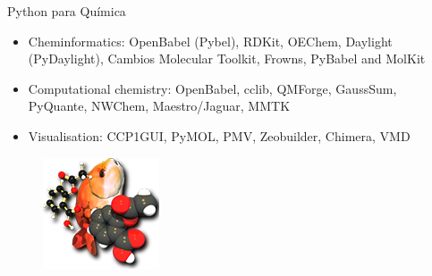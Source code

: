 \documentclass[12pt,t,graphics]{beamer}
\begin{document}
\begin{frame}[t]{Python para Química}
	\begin{itemize}
		\item Cheminformatics: OpenBabel (Pybel), RDKit, OEChem, Daylight 
		(PyDaylight), Cambios Molecular Toolkit, Frowns, PyBabel and MolKit 
		\item Computational chemistry: OpenBabel, cclib, QMForge, GaussSum, 
		PyQuante, NWChem, Maestro/Jaguar, MMTK
		\item Visualisation: CCP1GUI, PyMOL, PMV, Zeobuilder, Chimera, VMD
	\end{itemize}
	
	\begin{figure}
		\centering
		\includegraphics[scale=0.5]{img/babel130.png}
	\end{figure}
\end{frame}

\end{document}
